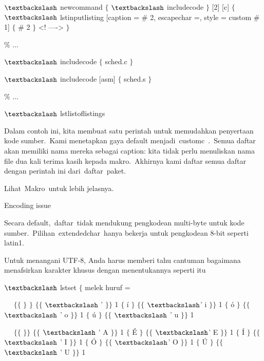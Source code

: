  $\textbackslash$ newcommand $ \{ $ $\textbackslash$ includecode $ \} $ [2] [c] $ \{ $ $\textbackslash$ lstinputlisting [caption = $\#$ 2, escapechar =, style = custom $\#$ 1] $ \{ $ $\#$ 2 $ \} $ <! ----> $ \} $\par

 $\%$ ...\par

 $\textbackslash$ includecode $ \{ $ sched.c $ \} $\par

 $\textbackslash$ includecode [asm] $ \{ $ sched.s $ \} $\par

 $\%$ ...\par

 $\textbackslash$ lstlistoflistings\par

Dalam contoh ini, kita membuat satu perintah untuk memudahkan penyertaan kode sumber. Kami menetapkan gaya default menjadi customc . Semua daftar akan memiliki nama mereka sebagai caption: kita tidak perlu menuliskan nama file dua kali terima kasih kepada makro. Akhirnya kami daftar semua daftar dengan perintah ini dari daftar paket.\par

Lihat Makro untuk lebih jelasnya.\par

Encoding issue \par

Secara default, daftar tidak mendukung pengkodean multi-byte untuk kode sumber. Pilihan extendedchar hanya bekerja untuk pengkodean 8-bit seperti latin1.\par

Untuk menangani UTF-8, Anda harus memberi tahu cantuman bagaimana menafsirkan karakter khusus dengan menentukannya seperti itu\par

 $\textbackslash$ lstset $ \{ $ melek huruf =\par

~~ $ \{ $$ \{ $ $ \} $ $ \} $ $ \{ $$ \{ $ $\textbackslash$ ' $ \} $$ \} $ 1 $ \{ $ í $ \} $ $ \{ $$ \{ $ $\textbackslash$' i $ \} $$ \} $ 1 $ \{ $ ó $ \} $ $ \{ $$ \{ $ $\textbackslash$ ' o $ \} $$ \} $ 1 $ \{ $ ú $ \} $ $ \{ $$ \{ $ $\textbackslash$ ' u $ \} $$ \} $ 1\par

~~ $ \{ $$ \{ $ $ \} $$ \} $ $ \{ $$ \{ $ $\textbackslash$ ' A $ \} $$ \} $ 1 $ \{ $ É $ \} $ $ \{ $$ \{ $ $\textbackslash$' E $ \} $$ \} $ 1 $ \{ $ Í $ \} $ $ \{ $$ \{ $ $\textbackslash$ ' I $ \} $$ \} $ 1 $ \{ $ Ó $ \} $ $ \{ $$ \{ $ $\textbackslash$' O $ \} $$ \} $ 1 $ \{ $ Ú $ \} $ $ \{ $$ \{ $ $\textbackslash$ ' U $ \} $$ \} $ 1\par

